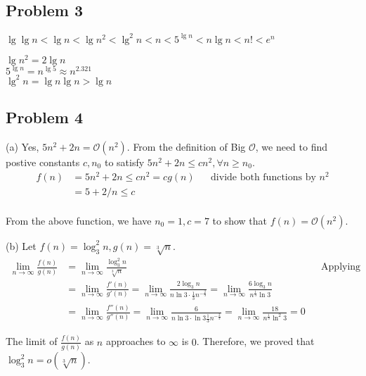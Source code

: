 \documentclass[a4paper]{article}
\makeatletter
\newenvironment{solution}
  {\begin{proof}[Solution]}
  {\end{proof}}
\renewenvironment{proof}[1][\proofname]{%
  \par\pushQED{\qed}\normalfont%
  \topsep6\p@\@plus6\p@\relax
  \trivlist\item[\hskip\labelsep\bfseries#1\@addpunct{.}]%
  \ignorespaces
}{%
  \popQED\endtrivlist\@endpefalse
}
\makeatother
\begin{document}
\subsection*{Problem 3}

\begin{solution}
  $\lg\lg n < \lg n < \lg n^2 < \lg^2 n< n < 5^{\lg n} < n \lg n < n! < e^n$

 $\lg n^2 = 2\lg n$ \\
 $5^{\lg n} = n^{\lg 5} \approx n^{2.321}$ \\
 $\lg^2 n = \lg n \lg n > \lg n$
\end{solution}

\subsection*{Problem 4}

\begin{solution}
  (a) Yes, $5n^2 + 2n = \mathcal{O}(n^2)$. From the definition of Big $\mathcal{O}$, we need to find postive constants $c, n_0$ to satisfy $5n^2 + 2n \le cn^2, \forall n \ge n_0$.
  \begin{align*}
    f(n) &= 5n^2 + 2n \le cn^ 2 = cg(n) && \text{divide both functions by $n^2$}\\
        &= 5 + 2/n \le c \\
  \end{align*}

  From the above function, we have $n_0 = 1, c = 7$ to show that $f(n) = \mathcal{O}(n^2)$.
\end{solution}

\begin{solution}
  (b) Let $f(n) = \log_3^2 n, g(n) = \sqrt[3]{n}$.
  \begin{align*}
    \lim\limits_{n \to \infty}\frac{f(n)}{g(n)} &= \lim\limits_{n \to \infty}\frac{\log_3^2 n}{\sqrt[3]n} && \text{Applying L'Hospital's Rule} \\
                                                &= \lim\limits_{n \to \infty}\frac{f'(n)}{g'(n)} =  \lim\limits_{n \to \infty}\frac{2\log_3 n}{n \ln 3 \cdot \frac{1}{3} n^{-\frac{2}{3}}} = \lim\limits_{n \to \infty}\frac{6 \log_3 n}{n^{\frac{1}{3}} \ln 3}\\
                                                &= \lim\limits_{n \to \infty}\frac{f''(n)}{g''(n)} =\lim\limits_{n \to \infty}\frac{6}{n \ln 3 \cdot \ln 3 \frac{1}{3} n^{-\frac{2}{3}}} = \lim\limits_{n \to \infty}\frac{18}{n^{\frac{1}{3}} \ln^2 3} = 0
  \end{align*}

  The limit of $\frac{f(n)}{g(n)}$ as $n$ approaches to $\infty$ is $0$. Therefore, we proved that $\log_3^2 n = o(\sqrt[3]{n})$.
\end{solution}
\end{document}
